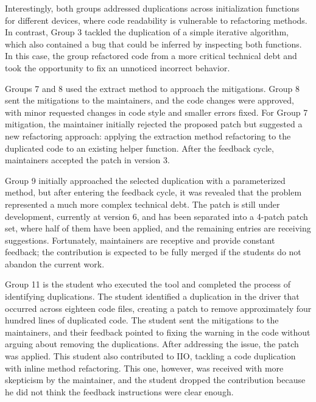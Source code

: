\documentclass[12pt]{article}
\begin{document}
Interestingly, both groups addressed duplications across initialization functions for different devices, where code readability is vulnerable to refactoring methods. In contrast, Group 3 tackled the duplication of a simple iterative algorithm, which also contained a bug that could be inferred by inspecting both functions. In this case, the group refactored code from a more critical technical debt and took the opportunity to fix an unnoticed incorrect behavior.



Groups 7 and 8 used the extract method to approach the mitigations. Group 8 sent the mitigations to the maintainers, and the code changes were approved, with minor requested changes in code style and smaller errors fixed. For Group 7 mitigation, the maintainer initially rejected the proposed patch but suggested a new refactoring approach: applying the extraction method refactoring to the duplicated code to an existing helper function. After the feedback cycle, maintainers accepted the patch in version 3.

Group 9 initially approached the selected duplication with a parameterized method, but after entering the feedback cycle, it was revealed that the problem represented a much more complex technical debt. The patch is still under development, currently at version 6, and has been separated into a 4-patch patch set, where half of them have been applied, and the remaining entries are receiving suggestions. Fortunately, maintainers are receptive and provide constant feedback; the contribution is expected to be fully merged if the students do not abandon the current work.

Group 11 is the student who executed the tool and completed the process of identifying duplications. The student identified a duplication in the driver that occurred across eighteen code files, creating a patch to remove approximately four hundred lines of duplicated code. The student sent the mitigations to the maintainers, and their feedback pointed to fixing the warning in the code without arguing about removing the duplications. After addressing the issue, the patch was applied. This student also contributed to IIO, tackling a code duplication with inline method refactoring. This one, however, was received with more skepticism by the maintainer, and the student dropped the contribution because he did not think the feedback instructions were clear enough.
\end{document}
